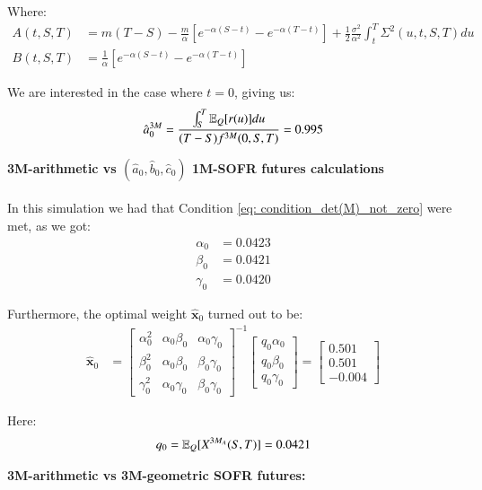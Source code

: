 Where: 
\begin{align*}
A(t,S,T) &= m(T-S) - \frac{m}{\alpha}\left[
e^{-\alpha(S-t)} - e^{-\alpha(T-t)}
\right] + \frac{1}{2}\frac{\sigma^{2}}{\alpha^{2}}\int_{t}^{T}\Sigma^{2}(u,t,S,T)du \\
B(t,S,T) &= \frac{1}{\alpha}\left[
e^{-\alpha(S-t)} - e^{-\alpha(T-t)}
\right]
\end{align*}

We are interested in the case where $t=0$, giving us:
\begin{align*}
\hat{a}_{0}^{3M} = \frac{
\int_{S}^{T}\mathbb{E}_{Q}[r(u)]du
}{
(T-S)f^{3M}(0,S,T)
}
= 0.995
\end{align*}

\textbf{3M-arithmetic vs $(\hat{a}_{0}, \hat{b}_{0}, \hat{c}_{0})$ 1M-SOFR futures calculations}
\\~\\
In this simulation we had that Condition \ref{eq: condition_det(M)_not_zero} were met, as we got:
\begin{align*}
\alpha_{0} &= 0.0423 \\ 
\beta_{0} &= 0.0421 \\ 
\gamma_{0} &= 0.0420
\end{align*}

Furthermore, the optimal weight $\hat{\mathbf{x}}_{0}$ turned out to be:
\begin{align*}
\hat{\mathbf{x}}_{0} &= 
\begin{bmatrix}
\alpha_{0}^{2} & \alpha_{0}\beta_{0} & \alpha_{0}\gamma_{0} \\ 
\beta_{0}^{2} & \alpha_{0}\beta_{0} & \beta_{0}\gamma_{0} \\ 
\gamma_{0}^{2} & \alpha_{0}\gamma_{0} & \beta_{0}\gamma_{0}
\end{bmatrix}^{-1}
\begin{bmatrix}
q_{0}\alpha_{0} \\ 
q_{0}\beta_{0} \\ 
q_{0}\gamma_{0}
\end{bmatrix}
=
\begin{bmatrix}
0.501 \\
0.501 \\
-0.004
\end{bmatrix} 
\end{align*}

Here:
\[
q_{0} = \mathbb{E}_{Q}[X^{3M_{A}}(S,T)] = 0.0421
\]


\newpage


\textbf{3M-arithmetic vs 3M-geometric SOFR futures:}

